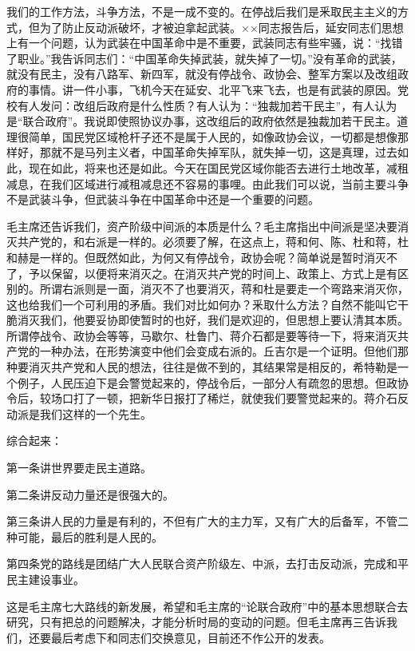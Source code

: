 我们的工作方法，斗争方法，不是一成不变的。在停战后我们是釆取民主主义的方式，但为了防止反动派破坏，才被迫拿起武装。××同志报告后，延安同志们思想上有一个问题，认为武装在中国革命中是不重要，武装同志有些牢骚，说：“找错了职业。”我告诉同志们：“中国革命失掉武装，就失掉了一切。”没有革命的武装，就没有民主，没有八路军、新四军，就没有停战令、政协会、整军方案以及改组政府的事情。讲一件小事，飞机今天在延安、北平飞来飞去，也是有武装的原因。党校有人发问：改组后政府是什么性质？有人认为：“独裁加若干民主”，有人认为是“联合政府”。我说即使照协议办事，这改组后的政府依然是独裁加若干民主。道理很简单，国民党区域枪杆子还不是属于人民的，如像政协会议，一切都是想像那样好，那就不是马列主义者，中国革命失掉军队，就失掉一切，这是真理，过去如此，现在如此，将来也还是如此。今天在国民党区域你能否去进行土地改革，减租减息，在我们区域进行减租减息还不容易的事哩。由此我们可以说，当前主要斗争不是武装斗争，但武装斗争在中国革命中还是一个重要的问题。

毛主席还告诉我们，资产阶级中间派的本质是什么？毛主席指出中间派是坚决要消灭共产党的，和右派是一样的。必须要了解，在这点上，蒋和何、陈、杜和蒋，杜和赫是一样的。但既然如此，为何又有停战令，政协会呢？简单说是暂时消灭不了，予以保留，以便将来消灭之。在消灭共产党的时间上、政策上、方式上是有区别的。所谓右派则是一面，消灭不了也要消灭，蒋和杜是要走一个弯路来消灭你，这也给我们一个可利用的矛盾。我们对比如何办？釆取什么方法？自然不能叫它干脆消灭我们，他要妥协即使暂时的也好，我们是欢迎的，但思想上要认清其本质。所谓停战令、政协会等等，马歇尔、杜鲁门、蒋介石都是要等待一下，将来消灭共产党的一种办法，在形势演变中他们会变成右派的。丘吉尔是一个证明。但他们那种要消灭共产党和人民的想法，往往是做不到的，其结果常是相反的，希特勒是一个例子，人民压迫下是会警觉起来的，停战令后，一部分人有疏忽的思想。但政协令后，较场口打了一顿，把新华日报打了稀烂，就使我们要警觉起来的。蒋介石反动派是我们这样的一个先生。

综合起来：

第一条讲世界要走民主道路。

第二条讲反动力量还是很强大的。

第三条讲人民的力量是有利的，不但有广大的主力军，又有广大的后备军，不管二种可能，最后的胜利是人民的。

第四条党的路线是团结广大人民联合资产阶级左、中派，去打击反动派，完成和平民主建设事业。

这是毛主席七大路线的新发展，希望和毛主席的“论联合政府”中的基本思想联合去研究，只有把总的问题解决，才能分析时局的变动的问题。但毛主席再三告诉我们，还要最后考虑下和同志们交换意见，目前还不作公开的发表。

